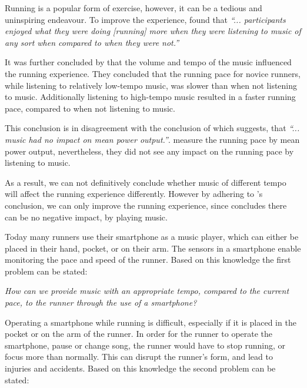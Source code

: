 Running is a popular form of exercise, however, it can be a tedious and uninspiring endeavour.
To improve the experience, \citet{musicRunEffectArticle} found that 
\textit{``... participants enjoyed what they were doing [running] more when they were listening to music of any sort when compared to when they were not.''}

It was further concluded by \citet{musicRunEffectArticle} that the volume and tempo of the music influenced the running experience.
They concluded that the running pace for novice runners, while listening to relatively low-tempo music, was slower than when not listening to music. Additionally listening to high-tempo music resulted in a faster running pace, compared to when not listening to music.

This conclusion is in disagreement with the conclusion of \citet{musicNoPerformanceEffect} which suggests, that \textit{``... music had no impact on mean power output.''}. \citet{musicNoPerformanceEffect} measure the running pace by mean power output, nevertheless, they did not see any impact on the running pace by listening to music.

As a result, we can not definitively conclude whether music of different tempo will affect the running experience differently. 
However by adhering to \citet{musicRunEffectArticle}'s conclusion, we can only improve the running experience, since \citet{musicNoPerformanceEffect} concludes there can be no negative impact, by playing music.

Today many runners use their smartphone as a music player, which can either be placed in their hand, pocket, or on their arm.
The sensors in a smartphone enable monitoring the pace and speed of the runner.
Based on this knowledge the first problem can be stated:

\begin{center}
\textit{How can we provide music with an appropriate tempo, compared to the current pace, to the runner through the use of a smartphone?}
\end{center}

\noindent Operating a smartphone while running is difficult, especially if it is placed in the pocket or on the arm of the runner.
In order for the runner to operate the smartphone, pause or change song, the runner would have to stop running, or focus more than normally. 
This can disrupt the runner's form, and lead to injuries and accidents.
Based on this knowledge the second problem can be stated: 

